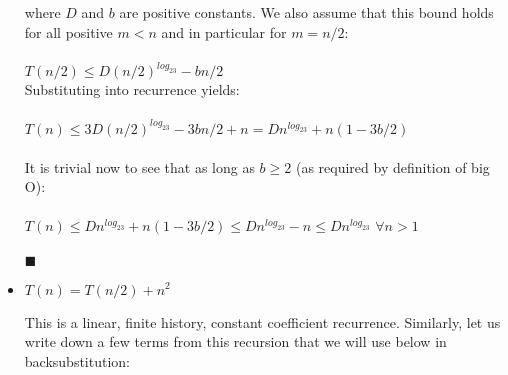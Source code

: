 \documentclass[a4paper]{article}
\begin{document}
\begin{itemize}
where $D$ and $b$ are positive constants. We also assume that this bound holds for all positive $m<n$ and in particular for $m = n/2$: \\ \\
$T(n/2) \leq D(n/2)^{log_23} - bn/2$ \\
Substituting into recurrence yields: \\ \\
$T(n) \leq 3D(n/2)^{log_23} - 3bn/2 + n = Dn^{log_23} + n(1-3b/2)$ \\ \\
It is trivial now to see that as long as $b\ge 2$ (as required by definition of big O): \\ \\
$T(n) \leq Dn^{log_23} + n(1-3b/2) \leq Dn^{log_23} - n \leq Dn^{log_23}$  $\forall n>1$\\ \\
$\blacksquare$

\item $T(n) = T(n/2) + n^2$

This is a linear, finite history, constant coefficient recurrence. Similarly, let us write down a few terms from this recursion that we will use below in backsubstitution: \\


\end{itemize}
\end{document}
